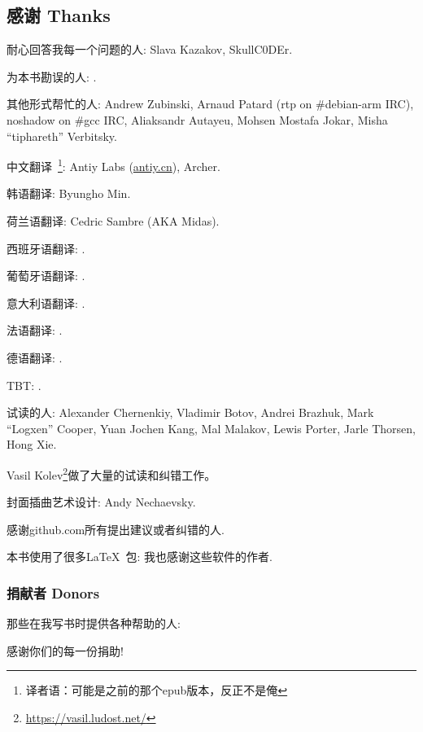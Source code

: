 \documentclass[UTF8,nofonts]{ctexart}
\begin{document}

\subsection*{感谢 Thanks}

耐心回答我每一个问题的人: Slava  Kazakov, SkullC0DEr.

为本书勘误的人: \PeopleMistakesInaccuracies{}.

其他形式帮忙的人:
Andrew Zubinski,
Arnaud Patard (rtp on \#debian-arm IRC),
noshadow on \#gcc IRC,
Aliaksandr Autayeu,
Mohsen Mostafa Jokar,
Misha ``tiphareth'' Verbitsky.

中文翻译~\footnote{译者语：可能是之前的那个epub版本，反正不是俺}:
Antiy Labs (\href{http://antiy.cn}{antiy.cn}), Archer.

韩语翻译: Byungho Min.

荷兰语翻译: Cedric Sambre (AKA Midas).

西班牙语翻译: \PeopleSpanishTranslators{}.

葡萄牙语翻译: \PeoplePTBRTranslators{}.

意大利语翻译: \PeopleItalianTranslators{}.

法语翻译: \PeopleFrenchTranslators{}.

德语翻译: \PeopleGermanTranslators{}.

\ac{TBT}: \PeoplePolishTranslators{}.


试读的人:
Alexander  Chernenkiy,
Vladimir Botov,
Andrei Brazhuk,
Mark ``Logxen'' Cooper, Yuan Jochen Kang, Mal Malakov, Lewis Porter, Jarle Thorsen, Hong Xie.

Vasil Kolev\footnote{\url{https://vasil.ludost.net/}}做了大量的试读和纠错工作。

封面插曲艺术设计: Andy Nechaevsky.

感谢github.com所有提出建议或者纠错的人\FNGithubContributors{}.

本书使用了很多\LaTeX\ 包: 我也感谢这些软件的作者.

\subsubsection*{捐献者 Donors}

那些在我写书时提供各种帮助的人:



感谢你们的每一份捐助!
\end{document}
